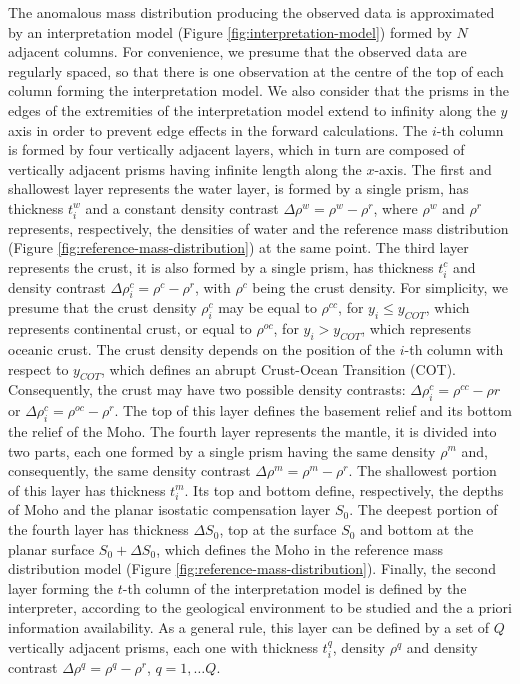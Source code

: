 \documentclass[manuscript]{geophysics}
\begin{document}
The anomalous mass distribution producing the observed data
is approximated by an interpretation model (Figure \ref{fig:interpretation-model}) 
formed by $N$ adjacent columns. For convenience, we presume that the observed data are
regularly spaced, so that there is one observation at the centre of the top of each
column forming the interpretation model. We also consider that the prisms in the edges
of the extremities of the interpretation model extend to infinity along the $y$ axis 
in order to prevent edge effects in the forward calculations. 
The $i$-th column is formed by four vertically adjacent 
layers, which in turn are composed of vertically adjacent prisms having infinite 
length along the $x$-axis. The first and shallowest layer represents the water layer, 
is formed by a single prism, has thickness $t^{w}_{i}$ and a constant density contrast 
$\Delta \rho^{w} = \rho^{w} - \rho^{r}$, where $\rho^{w}$ and $\rho^{r}$ 
represents, respectively, the densities of water and the reference mass 
distribution (Figure \ref{fig:reference-mass-distribution}) at the same point.
The third layer represents the crust, it is also formed by a single prism,
has thickness $t^{c}_{i}$ and density contrast 
$\Delta \rho^{c}_{i} = \rho^{c} - \rho^{r}$, 
with $\rho^{c}$ being the crust density. For simplicity, we presume that the crust
density $\rho^{c}_{i}$ may be equal to $\rho^{cc}$, for $y_{i} \le y_{COT}$, which
represents continental crust,
or equal to $\rho^{oc}$, for $y_{i} > y_{COT}$, which represents oceanic crust.
The crust density depends on the position of the $i$-th column with respect to
$y_{COT}$, which defines an abrupt Crust-Ocean Transition (COT). Consequently, the
crust may have two possible density contrasts: 
$\Delta \rho^{c}_{i} = \rho^{cc} - \rho{r}$ or 
$\Delta \rho^{c}_{i} = \rho^{oc} - \rho^{r}$. The top of this layer defines the 
basement relief and its bottom the relief of the Moho. The fourth layer represents the
mantle, it is divided into two parts, each one formed by a single prism having the same
density $\rho^{m}$ and, consequently, the same density contrast 
$\Delta \rho^{m} = \rho^{m} - \rho^{r}$. The shallowest
portion of this layer has thickness $t^{m}_{i}$. Its top and bottom define,
respectively, the depths of Moho and the planar isostatic compensation layer $S_{0}$.
The deepest portion of the fourth layer has thickness $\Delta S_{0}$, top at the
surface $S_{0}$ and bottom at the planar surface 
$S_{0} + \Delta S_{0}$, which defines the Moho in the reference mass distribution model 
(Figure \ref{fig:reference-mass-distribution}). Finally, the second layer forming the
$t$-th column of the interpretation model is defined by the interpreter, according to
the geological environment to be studied and the a priori information availability. 
As a general rule, this layer can be defined by a set of $Q$ vertically adjacent
prisms, each one with thickness $t^{q}_{i}$, density $\rho^{q}$ and density contrast
$\Delta \rho^{q} = \rho^{q} - \rho^{r}$, $q = 1, \dots Q$.
\end{document}
